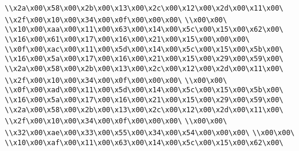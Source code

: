 \verb|\\x2a\x00\x58\x00\x2b\x00\x13\x00\x2c\x00\x12\x00\x2d\x00\x11\x00\|\newline
\verb|\\x2f\x00\x10\x00\x34\x00\x0f\x00\x00\x00\|\newline
\verb|\\x00\x00\|\newline
\verb|\\x10\x00\xaa\x00\x11\x00\x63\x00\x14\x00\x5c\x00\x15\x00\x62\x00\|\newline
\verb|\\x16\x00\x61\x00\x17\x00\x16\x00\x21\x00\x15\x00\x00\x00\|\newline
\verb|\\x0f\x00\xac\x00\x11\x00\x5d\x00\x14\x00\x5c\x00\x15\x00\x5b\x00\|\newline
\verb|\\x16\x00\x5a\x00\x17\x00\x16\x00\x21\x00\x15\x00\x29\x00\x59\x00\|\newline
\verb|\\x2a\x00\x58\x00\x2b\x00\x13\x00\x2c\x00\x12\x00\x2d\x00\x11\x00\|\newline
\verb|\\x2f\x00\x10\x00\x34\x00\x0f\x00\x00\x00\|\newline
\verb|\\x00\x00\|\newline
\verb|\\x0f\x00\xad\x00\x11\x00\x5d\x00\x14\x00\x5c\x00\x15\x00\x5b\x00\|\newline
\verb|\\x16\x00\x5a\x00\x17\x00\x16\x00\x21\x00\x15\x00\x29\x00\x59\x00\|\newline
\verb|\\x2a\x00\x58\x00\x2b\x00\x13\x00\x2c\x00\x12\x00\x2d\x00\x11\x00\|\newline
\verb|\\x2f\x00\x10\x00\x34\x00\x0f\x00\x00\x00\|\newline
\verb|\\x00\x00\|\newline
\verb|\\x32\x00\xae\x00\x33\x00\x55\x00\x34\x00\x54\x00\x00\x00\|\newline
\verb|\\x00\x00\|\newline
\verb|\\x10\x00\xaf\x00\x11\x00\x63\x00\x14\x00\x5c\x00\x15\x00\x62\x00\|\newline
